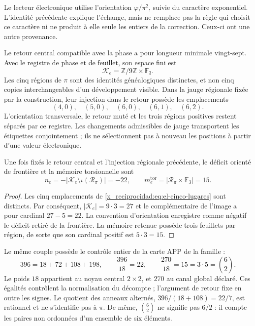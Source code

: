Le lecteur électronique utilise l'orientation \(\varphi/\pi^2\),
suivie du caractère exponentiel. L'identité précédente explique
l'échange, mais ne remplace pas la règle qui choisit ce caractère ni ne produit
à elle seule les entiers de la correction. Ceux-ci ont une autre provenance.

Le retour central compatible avec la phase a pour longueur minimale vingt-sept. Avec le registre de phase et de feuillet, son espace fini est
\[
 \mathcal K_e=\mathbb Z/9\mathbb Z\times\mathbb F_3.
\]
Les cinq régions de \(\pi\) sont des identités généalogiques distinctes,
et non cinq copies interchangeables d'un développement visible. Dans la jauge
régionale fixée par la construction, leur injection dans le retour possède
les emplacements
\begin{equation}
 (4,0),\quad(5,0),\quad(6,0),\quad(6,1),\quad(6,2).
 \label{x_reciprocidad:eq:el-cinco-lugares}
\end{equation}
L'orientation transversale, le retour muté et les trois régions positives restent séparés par ce registre. Les changements admissibles de jauge transportent les étiquettes conjointement ; ils ne sélectionnent pas à nouveau les positions à partir d'une valeur électronique.

\begin{proposition}
Une fois fixés le retour central et l'injection régionale précédente, le déficit
orienté de frontière et la mémoire torsionnelle sont
\begin{equation}
 n_e=-|\mathcal K_e\setminus\iota(\mathscr R_\pi)|=-22,
 \qquad
 m_e^{\mathrm{tor}}=|\mathscr R_\pi\times\mathbb F_3|=15.
 \label{x_reciprocidad:eq:el-selector-enteros}
\end{equation}
\end{proposition}
\begin{proof}
Les cinq emplacements de \eqref{x_reciprocidad:eq:el-cinco-lugares} sont distincts. Par
conséquent, \(|\mathcal K_e|=9\cdot3=27\) et le complémentaire de l'image
a pour cardinal \(27-5=22\). La convention d'orientation enregistre comme
négatif le déficit retiré de la frontière. La mémoire retenue possède
trois feuillets par région, de sorte que son cardinal positif est
\(5\cdot3=15\).
\end{proof}

Le même couple possède le contrôle entier de la carte APP de la famille :
\begin{equation}
 396=18+72+108+198,
 \qquad \frac{396}{18}=22,
 \qquad \frac{270}{18}=15=3\cdot5=\binom62.
 \label{x_reciprocidad:eq:el-censo}
\end{equation}
Le poids \(18\) appartient au noyau central \(2\times2\), et \(270\) au canal global déclaré. Ces égalités contrôlent la normalisation du décompte ; l'argument de retour fixe en outre les signes. Le quotient des anneaux alternés, \(396/(18+108)=22/7\), est rationnel et ne s'identifie pas à \(\pi\). De même, \(\binom62\) ne signifie pas \(6/2\) : il compte les paires non ordonnées d'un ensemble de six éléments.

